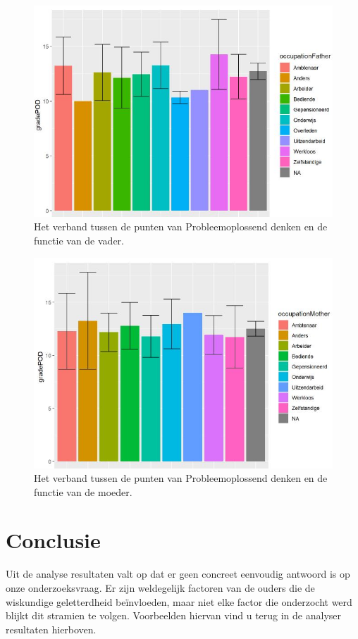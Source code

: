 \documentclass{hogent-article}
\begin{document}
\begin{figure}[h!]
    \includegraphics[width=\linewidth]{gradePOD-OccupationFather.JPG}
    \caption{Het verband tussen de punten van Probleemoplossend denken en de functie van de vader.}
    \label{fig:gradePOD-OccupationFather}
\end{figure}
\begin{figure}[h!]
    \includegraphics[width=\linewidth]{gradePOD-OccupationMother.JPG}
    \caption{Het verband tussen de punten van Probleemoplossend denken en de functie van de moeder.}
    \label{fig:gradePOD-OccupationMother}
\end{figure}

\section{Conclusie}
Uit de analyse resultaten valt op dat er geen concreet eenvoudig antwoord is op onze onderzoeksvraag. Er zijn weldegelijk factoren van de ouders die de wiskundige geletterdheid beïnvloeden, maar niet elke factor die onderzocht werd blijkt dit stramien te volgen. Voorbeelden hiervan vind u terug in de analyser resultaten hierboven. 
\end{document}

